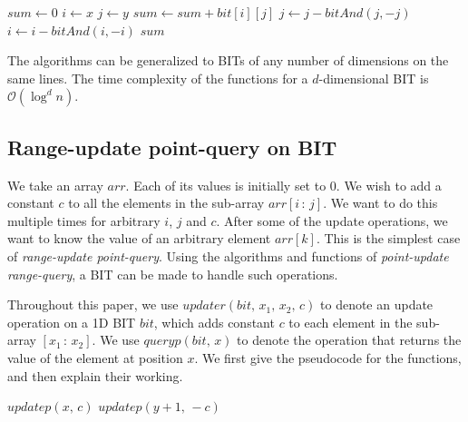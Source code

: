 \documentclass[a4paper]{article}
\begin{document}
\vspace {3 mm}
\noindent
{}
\begin{algorithmic}[1]

        \State $sum \gets 0$
        \State $i \gets x$
            \State $j \gets y$
                \State $sum \gets sum + bit[i][j]$
                \State $j \gets j - bitAnd(j, -j)$
            \EndWhile
            \State $i \gets i - bitAnd(i, -i)$
        \EndWhile
        \State \Return $sum$
\EndFunction
\end{algorithmic}

\vspace{3 mm}
The algorithms can be generalized to BITs of any number of dimensions on the same lines. The time complexity of the functions for a $d$-dimensional BIT is $\mathcal{O}(\log^d n)$.



\subsection{Range-update point-query on BIT}
We take an array $arr$. Each of its values is initially set to 0. We wish to add a constant $c$ to all the elements in the sub-array $arr[i\, :\, j]$. We want to do this multiple times for arbitrary $i$, $j$ and $c$. After some of the update operations, we want to know the value of an arbitrary element $arr[k]$. This is the simplest case of \textit{range-update point-query}. Using the algorithms and functions of \textit{point-update range-query}, a BIT can be made to handle such operations.

\vspace{2 mm}
Throughout this paper, we use $updater(bit,\, x_1,\, x_2,\, c)$ to denote an update operation on a 1D BIT $bit$, which adds constant $c$ to each element in the sub-array $[x_1\, :\, x_2]$. We use $queryp(bit,\, x)$ to denote the operation that returns the value of the element at position $x$. We first give the pseudocode for the functions, and then explain their working.

\vspace {3 mm}
\noindent
{}
\begin{algorithmic}[1]

        \State $updatep(x,\, c)$
        \State $updatep(y+1,\, -c)$
\EndFunction
\end{algorithmic}
\end{document}
